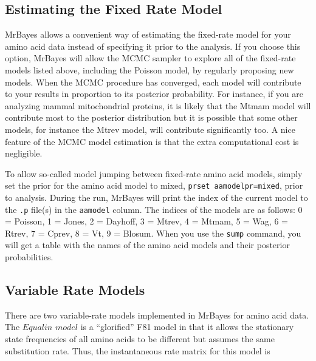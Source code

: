 \documentclass[12pt]{book}
\begin{document}
\subsection{Estimating the Fixed Rate Model}
\label{estimatingTheFixedRateModel}

MrBayes allows a convenient way of estimating the fixed-rate model for your amino acid data instead
of specifying it prior to the analysis. If you choose this option, MrBayes will allow the MCMC
sampler to explore all of the fixed-rate models listed above, including the Poisson model, by
regularly proposing new models. When the MCMC procedure has converged, each model will contribute
to your results in proportion to its posterior probability. For instance, if you are analyzing
mammal mitochondrial proteins, it is likely that the Mtmam model will contribute most to the
posterior distribution but it is possible that some other models, for instance the Mtrev model,
will contribute significantly too. A nice feature of the MCMC model estimation is that the extra
computational cost is negligible.

To allow so-called model jumping between fixed-rate amino acid models, simply set the prior for the
amino acid model to mixed, \texttt{prset aamodelpr=mixed}, prior to analysis. During the run,
MrBayes will print the index of the current model to the \texttt{.p} file(s) in the
\texttt{aamodel} column. The indices of the models are as follows: 0 = Poisson, 1 = Jones, 2 =
Dayhoff, 3 = Mtrev, 4 = Mtmam, 5 = Wag, 6 = Rtrev, 7 = Cprev, 8 = Vt, 9 = Blosum. When you use the
\texttt{sump} command, you will get a table with the names of the amino acid models and their
posterior probabilities.

\subsection{Variable Rate Models}

There are two variable-rate models implemented in MrBayes for amino acid data. The $Equalin$
$model$ is a ``glorified'' F81 model in that it allows the stationary state frequencies of all
amino acids to be different but assumes the same substitution rate. Thus, the instantaneous rate
matrix for this model is
\end{document}
